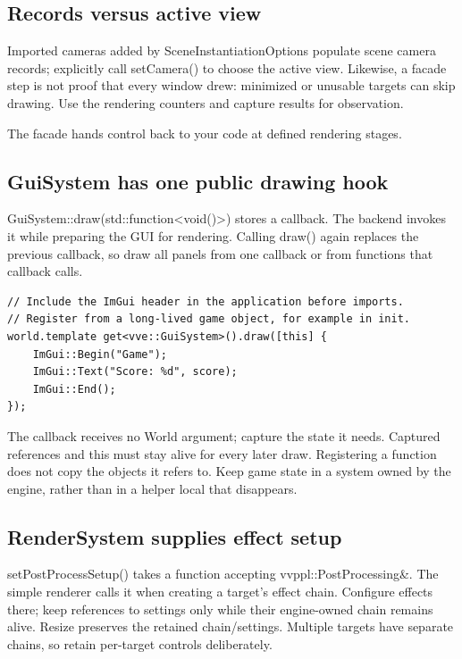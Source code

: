\documentclass[11pt,a4paper]{article}
\begin{document}
\subsection*{Records versus active view}
Imported cameras added by SceneInstantiationOptions populate scene camera records; explicitly call setCamera() to choose the active view. Likewise, a facade step is not proof that every window drew: minimized or unusable targets can skip drawing. Use the rendering counters and capture results for observation.

\label{core-18}
The facade hands control back to your code at defined rendering stages.

\subsection*{GuiSystem has one public drawing hook}
GuiSystem::draw(std::function<void()>) stores a callback. The backend invokes it while preparing the GUI for rendering. Calling draw() again replaces the previous callback, so draw all panels from one callback or from functions that callback calls.

\begin{lstlisting}[language={}]
// Include the ImGui header in the application before imports.
// Register from a long-lived game object, for example in init.
world.template get<vve::GuiSystem>().draw([this] {
    ImGui::Begin("Game");
    ImGui::Text("Score: %d", score);
    ImGui::End();
});
\end{lstlisting}

The callback receives no World argument; capture the state it needs. Captured references and this must stay alive for every later draw. Registering a function does not copy the objects it refers to. Keep game state in a system owned by the engine, rather than in a helper local that disappears.

\subsection*{RenderSystem supplies effect setup}
setPostProcessSetup() takes a function accepting vvppl::PostProcessing\&. The simple renderer calls it when creating a target's effect chain. Configure effects there; keep references to settings only while their engine-owned chain remains alive. Resize preserves the retained chain/settings. Multiple targets have separate chains, so retain per-target controls deliberately.
\end{document}
